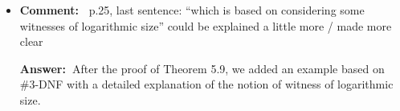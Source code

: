 \documentclass[a4paper]{article}
\newcommand{\ans}{{\bf Answer:\ }}
\newcommand{\cm}[1]{{\bf Comment:\ } #1}
\begin{document}
\begin{itemize}
	\ans For ordered structures the vocabulary should always include $<$. The encoding function in the paper was revised to make this more clear.
	
	\item \cm{p.25, last sentence: ``which is based on considering some witnesses of logarithmic size'' could be explained a little more / made more clear}
	
	\ans After the proof of Theorem 5.9, we added an example based on \#3-DNF with a detailed explanation of the notion of witness of logarithmic size.
	

\end{itemize}
\end{document}
